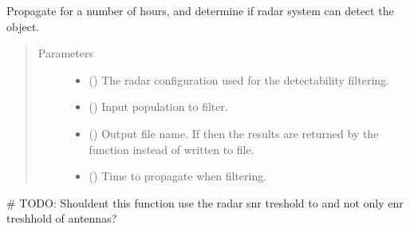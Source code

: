 \documentclass[letterpaper,10pt,english]{sphinxmanual}
\begin{document}
\begin{fulllineitems}
\label{\detokenize{modules/population_filter:population_filter.filter_objects}}
Propagate for a number of hours, and determine if radar system can detect the object.
\begin{quote}\begin{description}
\item[{Parameters}] \leavevmode\begin{itemize}
\item {} 
 ({\hyperref[\detokenize{modules/radar_config:radar_config.RadarSystem}]{}}) \textendash{} The radar configuration used for the detectability filtering.

\item {} 
 ({\hyperref[\detokenize{modules/population:population.Population}]{}}) \textendash{} Input population to filter.

\item {} 
 () \textendash{} Output file name. If  then the results are returned by the function instead of written to file.

\item {} 
 () \textendash{} Time to propagate when filtering.

\end{itemize}

\end{description}\end{quote}

\# TODO: Shouldent this function use the radar snr treshold to and not only enr treshhold of antennas?

\end{fulllineitems}

\end{document}
